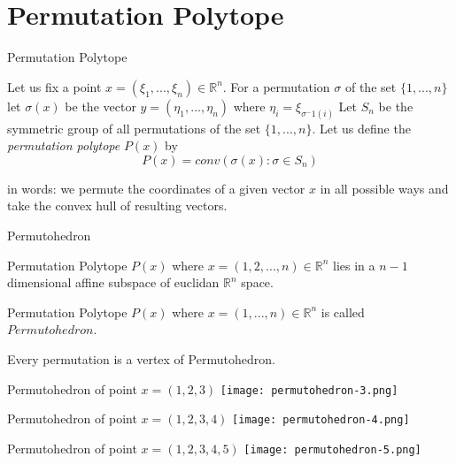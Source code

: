 \documentclass{beamer}
\theoremstyle{plain}
\theoremstyle{definition}
\begin{document}
\section{Permutation Polytope}
\begin{frame}{Permutation Polytope} 
    \begin{definition}
    Let us fix a point $x=(\xi_{1},...,\xi_{n}) \in \mathbb{R}^n$. For a permutation $\sigma$ of the set $\{1,...,n\}$ let $\sigma(x)$ be the vector  $y =(\eta_{1},...,\eta_{n})$ where $\eta_{i} = \xi_{\sigma^-1(i)}$
    Let $S_{n}$ be the symmetric group of all permutations of the set $\{1,...,n\}$. Let us define the \textit{permutation polytope} $P(x)$ by
    $$P(x) = conv(\sigma(x) : \sigma \in S_{n})$$
    \end{definition}
    in words: we permute the coordinates of a given vector $x$ in all possible ways and take the convex hull of resulting vectors.
    
\end{frame}
\begin{frame}{Permutohedron}
    \begin{theorem}
        Permutation Polytope $P(x)$ where $x = (1,2,...,n) \in \mathbb{R}^n$ lies in a $n-1$ dimensional affine subspace of euclidan $\mathbb{R}^n$ space.  
    \end{theorem}
    \begin{definition}
        Permutation Polytope $P(x)$ where $x = (1,...,n) \in \mathbb{R}^n$ is called $Permutohedron$.
    \end{definition}
    \begin{theorem}
        Every permutation is a vertex of Permutohedron.
    \end{theorem}

\end{frame}
\begin{frame}{Permutohedron of point $x = (1,2,3)$}
    \centering
    \texttt{[image: permutohedron-3.png]}
\end{frame}
\begin{frame}{Permutohedron of point $x = (1,2,3,4)$}
    \centering
    \texttt{[image: permutohedron-4.png]}
\end{frame}
\begin{frame}{Permutohedron of point $x = (1,2,3,4,5)$}
    \centering
    \texttt{[image: permutohedron-5.png]}
\end{frame}
\end{document}

